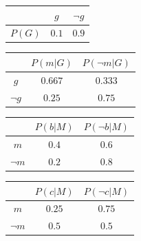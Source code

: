 \documentclass[9pt,a4paper]{extarticle}
\begin{document}
\begin{table}[h]
    \centering
    \begin{tabular}{|c|c|c|}
    \hline
         & $g$ & $\lnot g$ \\    \hline
        $P(G)$ & $0.1$ & $0.9$ \\    \hline
    \end{tabular}

    \begin{tabular}{|c|c|c|}
    \hline
         & $P(m|G)$ & $P(\lnot m|G)$ \\    \hline
        $g$ & $0.667$ & $0.333$\\     \hline
        $\lnot g$ & $0.25$ & $0.75$ \\ \hline 
    \end{tabular}

    \begin{tabular}{|c|c|c|}
    \hline
         & $P(b|M)$ & $P(\lnot b|M)$ \\    \hline
        $m$ & $0.4$ & $0.6$\\     \hline
        $\lnot m$ & $0.2$ & $0.8$ \\ \hline 
    \end{tabular}

    \begin{tabular}{|c|c|c|}
    \hline
         & $P(c|M)$ & $P(\lnot c|M)$ \\    \hline
        $m$ & $0.25$ & $0.75$\\     \hline
        $\lnot m$ & $0.5$ & $0.5$ \\ \hline 
    \end{tabular}
\end{table}
\end{document}
